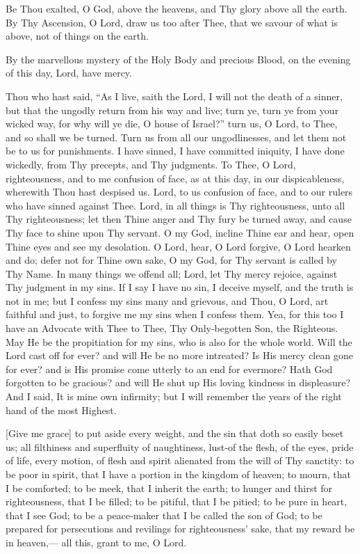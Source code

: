 Be Thou exalted, O God, above the heavens, and Thy glory above all the earth. By Thy Ascension, O Lord, draw us too after Thee, that we savour of what is above, not of things on the earth.

By the marvellous mystery of the Holy Body and precious Blood, on the evening of this day,  Lord, have mercy.


Thou who hast said, “As I live, saith the Lord, I will not the death of a sinner, but that the ungodly return from his way and live; turn ye, turn ye from your wicked way, for why will ye die, O house of Israel?” turn us, O Lord, to Thee, and so shall we be turned. Turn us from all our ungodlinesses, and let them not be to us for punishments.  I have sinned, I have committed iniquity, I have done wickedly, from Thy precepts, and Thy judgments. To Thee, O Lord, righteousness, and to me confusion of face, as at this day, in our dispicableness, wherewith Thou hast despised us. Lord, to us confusion of face, and to our rulers who have sinned against Thee.  Lord, in all things is Thy righteousness, unto all Thy righteousness; let then Thine anger and Thy fury be turned away, and cause Thy face to shine upon Thy servant. O my God, incline Thine ear and hear, open Thine eyes and see my desolation. O Lord, hear, O Lord forgive, O Lord hearken and do; defer not for Thine own sake, O my God, for Thy servant is called by Thy Name. In many things we offend all; Lord, let Thy mercy rejoice, against Thy judgment in my sins. If I say I have no sin, I deceive myself, and the truth is not in me; but I confess my sins many and grievous, and Thou, O Lord, art faithful and just, to forgive me my sins when I confess them. Yea, for this too I have an Advocate with Thee to Thee, Thy Only‑begotten Son, the Righteous.  May He be the propitiation for my sins, who is also for the whole world. Will the Lord cast off for ever? and will He be no more intreated? Is His mercy clean gone for ever? and is His promise come utterly to an end for evermore? Hath God forgotten to be gracious? and will He shut up His loving kindness in displeasure? And I said, It is mine own infirmity; but I will remember the years of the right hand of the most Highest.


[Give me grace] to put aside every weight, and the sin that doth so easily beset us; all filthiness and superfluity of naughtiness, lust‑of the flesh, of the eyes, pride of life, every motion, of flesh and spirit alienated from the will of Thy sanctity:  to be poor in spirit, that I have a portion in the kingdom of heaven; to mourn, that I be comforted; to be meek, that I inherit the earth; to hunger and thirst for righteousness, that I be filled; to be pitiful, that I be pitied; to be pure in heart, that I see God; to be a peace‑maker that I be called the son of God; to be prepared for persecutions and revilings for righteousness’ sake, that my reward be in heaven,— all this, grant to me, O Lord.

